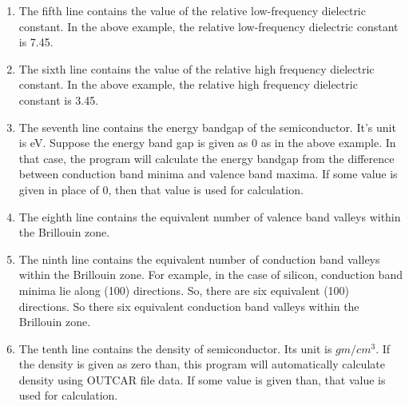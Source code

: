 \documentclass[12pt]{article}
\begin{document}
\begin{enumerate}
\begin{enumerate}[label=\Roman*]
\item The fifth line contains the value of the relative low-frequency dielectric constant. In the above example, the relative low-frequency dielectric constant is 7.45.  

\item The sixth line contains the value of the relative high frequency dielectric constant. In the above example, the relative high frequency dielectric constant is 3.45.

\item The seventh line contains the energy bandgap of the semiconductor. It's unit is eV. Suppose the energy band gap is given as 0 as in the above example. In that case, the program will calculate the energy bandgap from the difference between conduction band minima and valence band maxima. If some value is given in place of 0, then that value is used for calculation.


\item The eighth line contains the equivalent number of valence band valleys within the Brillouin zone. 

\item The ninth line contains the equivalent number of conduction band valleys within the Brillouin zone. For example, in the case of silicon, conduction band minima lie along (100) directions. So, there are six equivalent (100) directions. So there six equivalent conduction band valleys within the Brillouin zone.


\item The tenth line contains the density of semiconductor. Its unit is $gm/cm^3$. If the density is given as zero than, this program will automatically calculate density using OUTCAR file data. If some value is given than, that value is used for calculation.


\end{enumerate}
\end{enumerate}
\end{document}
